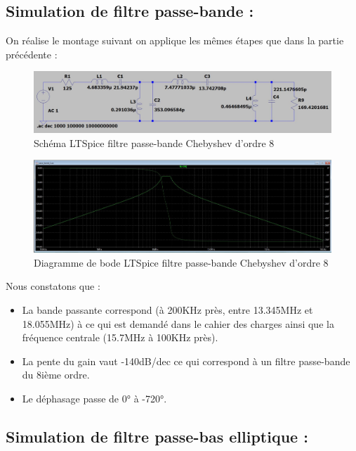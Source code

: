 \subsection{Simulation de filtre passe-bande :  }

On réalise le montage suivant on applique les mêmes étapes que dans la partie précédente : 

\begin{figure}[!htbp]
\includegraphics[width=\textwidth,height=\textheight,keepaspectratio]{src/circuits/passe band circuit.JPG}    \centering
    \caption{Schéma LTSpice filtre passe-bande Chebyshev d'ordre 8}
\end{figure}
\FloatBarrier

\begin{figure}[!htbp]
\includegraphics[width=\textwidth,height=\textheight,keepaspectratio]{img_simule/passe_bande_simule.JPG}
\centering
    \caption{Diagramme de bode LTSpice filtre passe-bande Chebyshev d'ordre 8}
\end{figure}
\FloatBarrier

Nous constatons que : 
\begin{itemize}
  \item La bande passante correspond (à 200KHz près, entre 13.345MHz et 18.055MHz) à ce qui est demandé dans le cahier des charges ainsi que la fréquence centrale (15.7MHz à 100KHz près). 
  \item La pente du gain vaut -140dB/dec ce qui correspond à un filtre passe-bande du 8ième ordre. 
  \item Le déphasage passe de 0° à -720°. 
\end{itemize}


\subsection{Simulation de filtre passe-bas elliptique :  }

